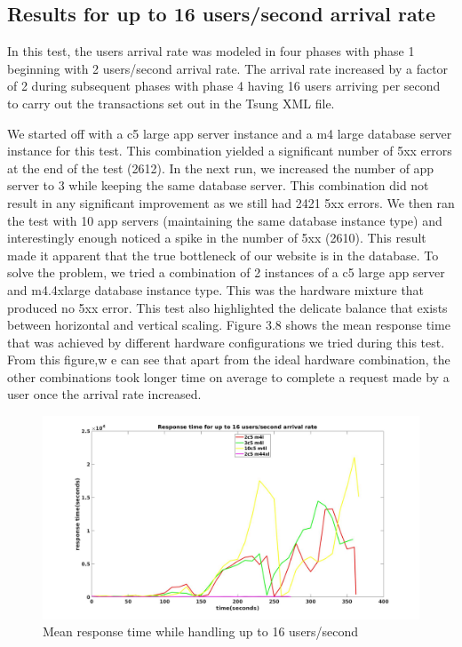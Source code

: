 \subsection{Results for up to 16 users/second arrival rate}

In this test, the users arrival rate was modeled in four phases with phase 1 beginning with 2 users/second arrival rate. The arrival rate increased by a factor of 2 during subsequent phases with phase 4 having 16 users arriving per second to carry out the transactions set out in the Tsung XML file. 

We started off with a c5 large app server instance and a m4 large database server instance for this test. This combination yielded a significant number of 5xx errors at the end of the test (2612). In the next run, we increased the number of app server to 3 while keeping the same database server. This combination did not result in any significant improvement as we still had 2421 5xx errors. We then ran the test with 10 app servers (maintaining the same database instance type) and interestingly enough noticed a spike in the number of 5xx (2610). This result made it apparent that the true bottleneck of our website is in the database. To solve the problem, we tried a combination of 2 instances of a c5 large app server and m4.4xlarge database instance type. This was the hardware mixture that produced no 5xx error. This test also highlighted the delicate balance that exists between horizontal and vertical scaling. Figure 3.8 shows the mean response time that was achieved by different hardware configurations we tried during this test. From this figure,w e can see that apart from the ideal hardware combination, the other combinations took longer time on average to complete a request made by a user once the arrival rate increased.

\begin{figure}[h]
	\centering
	\includegraphics[width=1\textwidth]{images/scale16.jpg}
	\caption{Mean response time while handling up to 16 users/second}\label{fig:sqlopt}
\end{figure}

